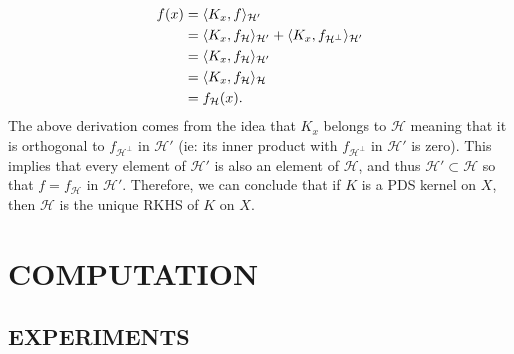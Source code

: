 \documentclass[12pt]{article}
\begin{document}
\begin{enumerate}[topsep=0pt, partopsep=0pt, itemsep=0pt, label=(\roman*)]
\begin{align*}
            f(x) &= \langle K_x,f\rangle_{\mathcal{H}'} \\
            &= \langle K_x,f_{\mathcal{H}}\rangle_{\mathcal{H}'} + \langle K_x,f_{\mathcal{H}^\perp}\rangle_{\mathcal{H}'} \\
            &= \langle K_x,f_{\mathcal{H}}\rangle_{\mathcal{H}'} \\
            &= \langle K_x,f_{\mathcal{H}}\rangle_{\mathcal{H}} \\
            &= f_{\mathcal{H}}(x).
        \end{align*}
        The above derivation comes from the idea that $K_x$ belongs to $\mathcal{H}$ meaning that it is orthogonal to
        $f_{\mathcal{H}^\perp}$ in $\mathcal{H}'$ (ie: its inner product with $f_{\mathcal{H}^\perp}$ in $\mathcal{H}'$ is zero).
        This implies that every element of $\mathcal{H}'$ is also an element of $\mathcal{H}$, and thus 
        $\mathcal{H}' \subset \mathcal{H}$ so that $f=f_\mathcal{H}$ in $\mathcal{H}'$. Therefore, we can conclude that
        if $K$ is a PDS kernel on $X$, then $\mathcal{H}$ is the unique RKHS of $K$ on $X$.


\end{enumerate}


\section*{COMPUTATION}

\subsection*{EXPERIMENTS}
\end{document}
